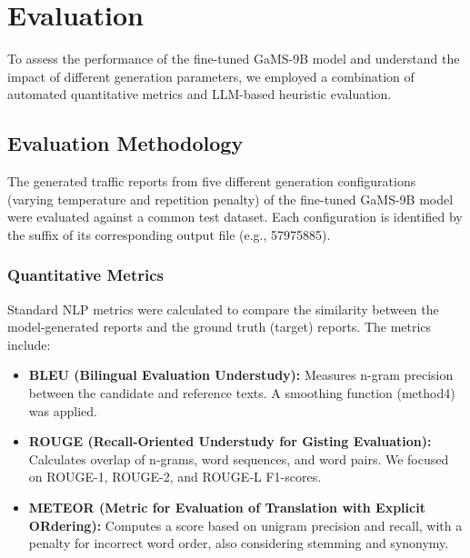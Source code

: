 \documentclass[fleqn,moreauthors,10pt]{ds_report}
\begin{document}
\section*{Evaluation}
To assess the performance of the fine-tuned GaMS-9B model and understand the impact of different generation parameters, we employed a combination of automated quantitative metrics and LLM-based heuristic evaluation.

\subsection*{Evaluation Methodology}
The generated traffic reports from five different generation configurations (varying temperature and repetition penalty) of the fine-tuned GaMS-9B model were evaluated against a common test dataset. Each configuration is identified by the suffix of its corresponding output file (e.g., 57975885).

\subsubsection*{Quantitative Metrics}
Standard NLP metrics were calculated to compare the similarity between the model-generated reports and the ground truth (target) reports. The metrics include:
\begin{itemize}
    \item \textbf{BLEU (Bilingual Evaluation Understudy):} Measures n-gram precision between the candidate and reference texts. A smoothing function (method4) was applied.
    \item \textbf{ROUGE (Recall-Oriented Understudy for Gisting Evaluation):} Calculates overlap of n-grams, word sequences, and word pairs. We focused on ROUGE-1, ROUGE-2, and ROUGE-L F1-scores.
    \item \textbf{METEOR (Metric for Evaluation of Translation with Explicit ORdering):} Computes a score based on unigram precision and recall, with a penalty for incorrect word order, also considering stemming and synonymy.
\end{itemize}
\end{document}
